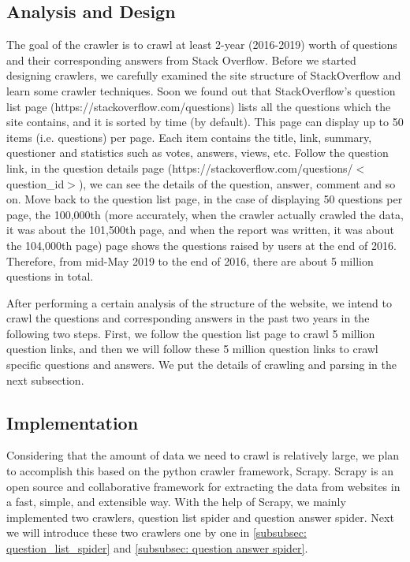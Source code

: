 \documentclass[10pt,journal,compsoc]{IEEEtran}
\begin{document}
\subsection{Analysis and Design}
\label{subsec:analysis_and_design}

The goal of the crawler is to crawl at least 2-year (2016-2019) worth of questions and their corresponding answers from Stack Overflow. Before we started designing crawlers, we carefully examined the site structure of StackOverflow and learn some crawler techniques\cite{kausar2013web}. Soon we found out that StackOverflow's question list page (https://stackoverflow.com/questions) lists all the questions which the site contains, and it is sorted by time (by default). This page can display up to 50 items (i.e. questions) per page. Each item contains the title, link, summary, questioner and statistics such as votes, answers, views, etc. Follow the question link, in the question details page (https://stackoverflow.com/questions/$<$question\_id$>$), we can see the details of the question, answer, comment and so on. Move back to the question list page, in the case of displaying 50 questions per page, the 100,000th (more accurately, when the crawler actually crawled the data, it was about the 101,500th page, and when the report was written, it was about the 104,000th page) page shows the questions raised by users at the end of 2016. Therefore, from mid-May 2019 to the end of 2016, there are about 5 million questions in total.

After performing a certain analysis of the structure of the website, we intend to crawl the questions and corresponding answers in the past two years in the following two steps. First, we follow the question list page to crawl 5 million question links, and then we will follow these 5 million question links to crawl specific questions and answers. We put the details of crawling and parsing in the next subsection.

\subsection{Implementation}
\label{subsec:implementation}

Considering that the amount of data we need to crawl is relatively large, we plan to accomplish this based on the python crawler framework, Scrapy. Scrapy is an open source and collaborative framework for extracting the data from websites in a fast, simple, and extensible way. With the help of Scrapy, we mainly implemented two crawlers, question list spider and question answer spider. Next we will introduce these two crawlers one by one in \ref{subsubsec: question_list_spider} and \ref{subsubsec: question answer spider}.
\end{document}
